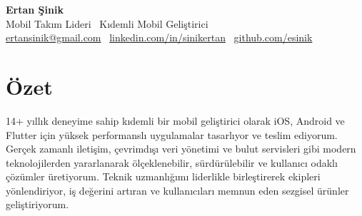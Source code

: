 \documentclass[11pt,a4paper]{extarticle}
\begin{document}
\begin{center}
    \begin{minipage}{\textwidth}
        \centering
        {\Huge\textbf{Ertan Şinik}}\\[4pt]
        {\large Mobil Takım Lideri \textbar\ Kıdemli Mobil Geliştirici}\\[10pt]
        \href{mailto:ertansinik@gmail.com}{ertansinik@gmail.com} \textbullet\
        \href{https://linkedin.com/in/sinikertan}{linkedin.com/in/sinikertan} \textbullet\
        \href{https://github.com/esinik}{github.com/esinik}
    \end{minipage}
\end{center}

\section{Özet}
14+ yıllık deneyime sahip kıdemli bir mobil geliştirici olarak iOS, Android ve Flutter için yüksek performanslı uygulamalar tasarlıyor ve teslim ediyorum. Gerçek zamanlı iletişim, çevrimdışı veri yönetimi ve bulut servisleri gibi modern teknolojilerden yararlanarak ölçeklenebilir, sürdürülebilir ve kullanıcı odaklı çözümler üretiyorum. Teknik uzmanlığımı liderlikle birleştirerek ekipleri yönlendiriyor, iş değerini artıran ve kullanıcıları memnun eden sezgisel ürünler geliştiriyorum.
\end{document}
